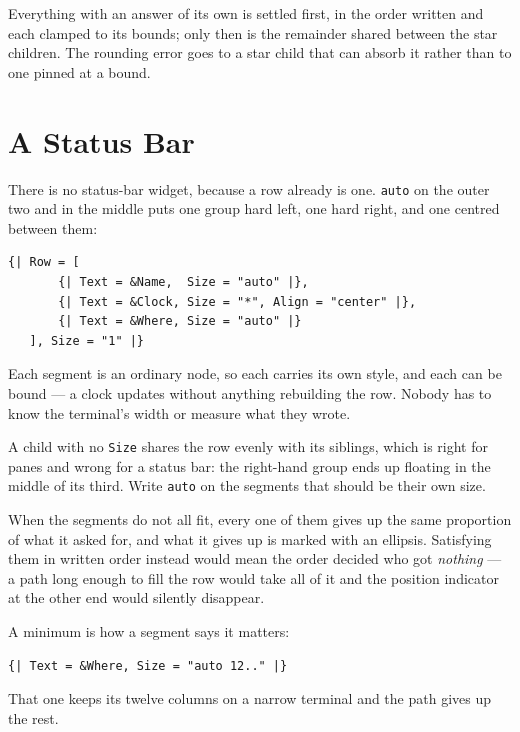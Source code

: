 \documentclass[11pt,a4paper,twoside,openany]{book}
\newcommand{\code}[1]{\texttt{\small #1}}
\begin{document}
Everything with an answer of its own is settled first, in the order written and
each clamped to its bounds; only then is the remainder shared between the star
children. The rounding error goes to a star child that can absorb it rather than
to one pinned at a bound.

\section{A Status Bar}
\label{sec:statusbar}

There is no status-bar widget, because a row already is one. \code{auto} on the
outer two and \code{*} in the middle puts one group hard left, one hard right, and
one centred between them:

\begin{lstlisting}
{| Row = [
       {| Text = &Name,  Size = "auto" |},
       {| Text = &Clock, Size = "*", Align = "center" |},
       {| Text = &Where, Size = "auto" |}
   ], Size = "1" |}
\end{lstlisting}

Each segment is an ordinary node, so each carries its own style, and each can be
bound --- a clock updates without anything rebuilding the row. Nobody has to know
the terminal's width or measure what they wrote.

\begin{warnbox}
A child with no \code{Size} shares the row evenly with its siblings, which is right
for panes and wrong for a status bar: the right-hand group ends up floating in the
middle of its third. Write \code{auto} on the segments that should be their own
size.
\end{warnbox}

When the segments do not all fit, every one of them gives up the same proportion of
what it asked for, and what it gives up is marked with an ellipsis. Satisfying them
in written order instead would mean the order decided who got \emph{nothing} --- a
path long enough to fill the row would take all of it and the position indicator at
the other end would silently disappear.

A minimum is how a segment says it matters:

\begin{lstlisting}
{| Text = &Where, Size = "auto 12.." |}
\end{lstlisting}

That one keeps its twelve columns on a narrow terminal and the path gives up the
rest.
\end{document}

